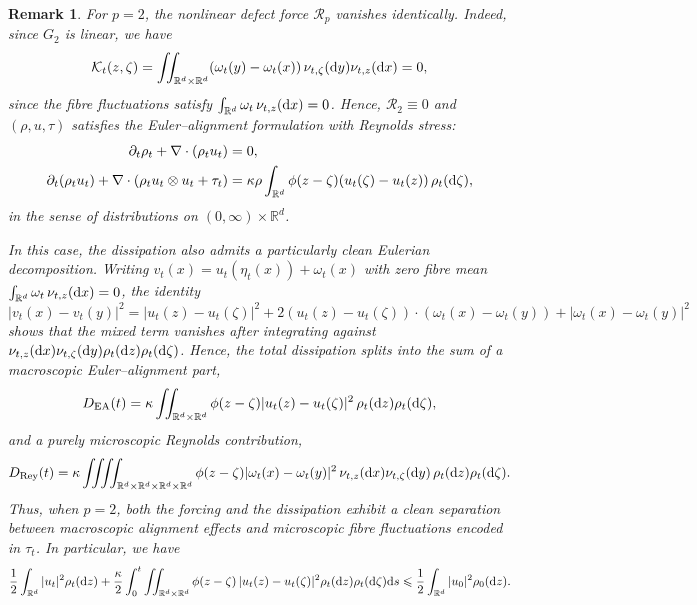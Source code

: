 \documentclass[10pt,reqno]{amsart}
\renewcommand{\leq}{\leqslant}
\numberwithin{equation}{section}
\newtheorem{remark}{Remark}[section]
\newcommand{\R}{\mathbb R}
\newcommand{\pa}{\partial}
\newcommand{\intr}{\int_{\R^d}}
\newcommand{\intrr}{\iint_{\R^d \times \R^d}}
\newcommand{\calK}{\mathcal K}
\newcommand{\calR}{\mathcal R}
\newcommand{\rd}{\textnormal{d}}
\newcommand{\dx}{\textnormal{d}x}
\newcommand{\dy}{\textnormal{d}y}
\newcommand{\dz}{\textnormal{d}z}
\newcommand{\ds}{\textnormal{d}s}
\begin{document}
\begin{remark}For $p=2$, the nonlinear defect force $\calR_p$ vanishes identically.  Indeed, since $G_2$ is linear, we have
\[
\calK_t(z,\zeta) = \intrr (\omega_t(y)-\omega_t(x)) \,\nu_{t,\zeta}(\dy) \nu_{t,z}(\dx) =0,
\]
since the fibre fluctuations satisfy $\intr \omega_t\,\nu_{t,z}(\dx)=0$. Hence, $\calR_2 \equiv 0$ and $(\rho, u, \tau)$ satisfies the Euler--alignment formulation with Reynolds stress:
\begin{align*}
\pa_t\rho_t+\nabla \cdot(\rho_t u_t)&=0, \\
\pa_t(\rho_t u_t)+\nabla \cdot(\rho_t u_t\otimes u_t + \tau_t)
&=\kappa\rho \intr \phi(z-\zeta) (u_t(\zeta)-u_t(z))\,\rho_t(\rd\zeta), 
\end{align*}
in the sense of distributions on $(0,\infty)\times\R^d$. 

In this case, the dissipation also admits a particularly clean Eulerian decomposition.  Writing $v_t(x)=u_t(\eta_t(x))+\omega_t(x)$ with zero fibre mean $\intr \omega_t\,\nu_{t,z}(\dx)=0$, the identity
\[ 
|v_t(x)-v_t(y)|^2 = |u_t(z)-u_t(\zeta)|^2 + 2(u_t(z)-u_t(\zeta)) \cdot(\omega_t(x)-\omega_t(y)) + |\omega_t(x)-\omega_t(y)|^2
\] 
shows that the mixed term vanishes after integrating against $\nu_{t,z}(\dx)\nu_{t,\zeta}(\dy)\rho_t(\dz)\rho_t(\rd\zeta)$.  Hence, the total dissipation splits into the sum of a macroscopic Euler--alignment part,
\[
D_{\rm{EA}}(t) =\kappa \intrr \phi(z-\zeta) |u_t(z)-u_t(\zeta)|^2\,\rho_t(\dz)\rho_t(\rd\zeta),
\]
and a purely microscopic Reynolds contribution,
\[
D_{{\rm Rey}}(t) =\kappa \iiiint_{\R^d \times \R^d \times \R^d \times \R^d} \phi(z-\zeta) |\omega_t(x)-\omega_t(y)|^2\,\nu_{t,z}(\dx)\nu_{t,\zeta}(\dy)\,\rho_t(\dz)\rho_t(\rd\zeta).
\]
Thus, when $p=2$, both the forcing and the dissipation exhibit a clean separation between macroscopic alignment effects and microscopic fibre fluctuations encoded in $\tau_t$. In particular, we have
\[
\frac12 \intr |u_t|^2 \rho_t(\dz) + \frac\kappa2\int_0^t \intrr \phi(z-\zeta)\,|u_t(z)-u_t(\zeta)|^2 \rho_t(\dz)\rho_t(\rd\zeta)\ds \leq \frac12\intr |u_0|^2 \rho_0(\dz).
\]
\end{remark}
 
\end{document}
